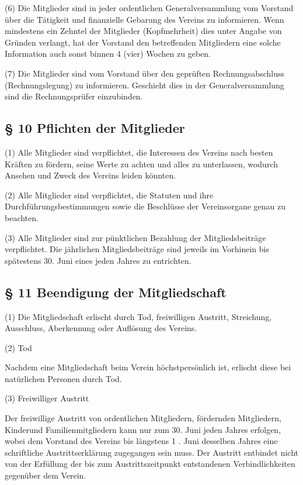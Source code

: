 \documentclass[11pt,a4paper]{article}
\begin{document}
(6)
Die Mitglieder sind in jeder ordentlichen Generalversammlung vom Vorstand über die Tätigkeit und finanzielle Gebarung des Vereins zu informieren.
Wenn mindestens ein Zehntel der Mitglieder (Kopfmehrheit) dies unter Angabe von Gründen verlangt, hat der Vorstand den betreffenden Mitgliedern eine solche Information auch sonst binnen 4 (vier) Wochen zu geben.

(7)
Die Mitglieder sind vom Vorstand über den geprüften Rechnungsabschluss (Rechnungslegung) zu informieren.
Geschieht dies in der Generalversammlung sind die Rechnungsprüfer einzubinden.

\subsection{§ 10
Pflichten der Mitglieder}

(1)
Alle Mitglieder sind verpflichtet, die Interessen des Vereins nach besten Kräften zu fördern, seine Werte zu achten und alles zu unterlassen, wodurch Ansehen und Zweck des Vereins leiden könnten.

(2)
Alle Mitglieder sind verpflichtet, die Statuten und ihre Durchführungsbestimmungen sowie die Beschlüsse der Vereinsorgane genau zu beachten.

(3)
Alle Mitglieder sind zur pünktlichen Bezahlung der Mitgliedsbeiträge verpflichtet.
Die jährlichen Mitgliedsbeiträge sind jeweils im Vorhinein bis spätestens 30. Juni eines jeden Jahres zu entrichten.

\subsection{§ 11
Beendigung der Mitgliedschaft}

(1)
Die Mitgliedschaft erlischt durch Tod, freiwilligen Austritt, Streichung, Ausschluss, Aberkennung oder Auflösung des Vereins.

(2)
Tod

Nachdem eine Mitgliedschaft beim Verein höchstpersönlich ist, erlischt diese bei natürlichen Personen durch Tod.

(3)
Freiwilliger Austritt

Der freiwillige Austritt von ordentlichen Mitgliedern, fördernden Mitgliedern, Kinderund Familienmitgliedern kann nur zum 30. Juni jeden Jahres erfolgen, wobei dem Vorstand des Vereins bis längstens 1 . Juni desselben Jahres eine schriftliche Austrittserklärung zugegangen sein muss.
Der Austritt entbindet nicht von der Erfüllung der bis zum Austrittszeitpunkt entstandenen Verbindlichkeiten gegenüber dem Verein.
\end{document}
